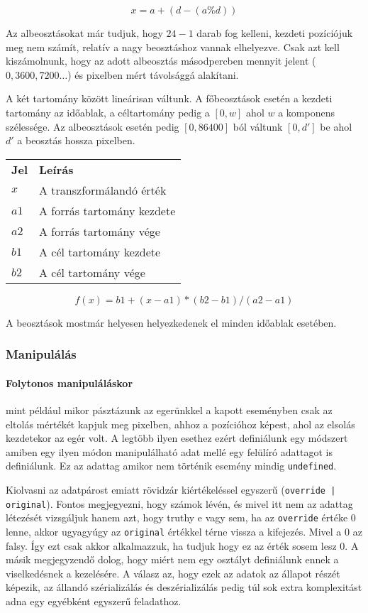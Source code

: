 $$x = a + (d - (a \% d))$$

Az albeosztásokat már tudjuk, hogy $24 - 1$ darab fog kelleni, kezdeti pozíciójuk meg nem számít, relatív a nagy beosztáshoz vannak elhelyezve. Csak azt kell kiszámolnunk, hogy az adott albeosztás másodpercben mennyit jelent ($0, 3600, 7200 \dots $) és pixelben mért távolsággá alakítani.


A két tartomány között lineárisan váltunk. A főbeosztások esetén a kezdeti tartomány az időablak, a céltartomány pedig a $[0, w]$ ahol $w$ a komponens szélessége. Az albeosztások esetén pedig $[0, 86400]$ ból váltunk $[0, d']$ be ahol $d'$ a beosztás hossza pixelben.

\begin{tabular}{@{}ll@{}}
	\textbf{Jel} & \textbf{Leírás} \\
	$x$ & A transzformálandó érték \\
	$a1$ & A forrás tartomány kezdete \\
	$a2$ & A forrás tartomány vége \\
	$b1$ & A cél tartomány kezdete \\
	$b2$ & A cél tartomány vége \\
\end{tabular}

$$ f(x) = b1 + ( x - a1 ) * ( b2 - b1 ) / ( a2 - a1 )$$

A beosztások mostmár helyesen helyezkedenek el minden időablak esetében.

\subsubsection{Manipulálás}

\paragraph{Folytonos manipuláláskor} mint például mikor pásztázunk az egerünkkel a kapott eseményben csak az eltolás mértékét kapjuk meg pixelben, ahhoz a pozícióhoz képest, ahol az elsolás kezdetekor az egér volt. A legtöbb ilyen esethez ezért definiálunk egy módszert amiben egy ilyen módon manipulálható adat mellé egy felülíró adattagot is definiálunk. Ez az adattag amikor nem történik esemény mindig \lstinline[columns=fixed]{undefined}.

Kiolvasni az adatpárost emiatt rövidzár kiértékeléssel egyszerű (\lstinline[columns=fixed]{override | original}). Fontos megjegyezni, hogy számok lévén, és mivel itt nem az adattag létezését vizsgáljuk hanem azt, hogy truthy e vagy sem, ha az \lstinline[columns=fixed]{override} értéke $0$ lenne, akkor ugyagyúgy az \lstinline[columns=fixed]{original} értékkel térne vissza a kifejezés. Mivel a $0$ az falsy. Így ezt csak akkor alkalmazzuk, ha tudjuk hogy ez az érték sosem lesz $0$. A másik megjegyzendő dolog, hogy miért nem egy osztályt definiálunk ennek a viselkedésnek a kezelésére. A válasz az, hogy ezek az adatok az állapot részét képezik, az állandó szérializálás és deszérializálás pedig túl sok extra komplexitást adna egy egyébként egyszerű feladathoz.

